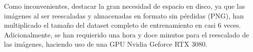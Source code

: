 Como inconvenientes, destacar la gran necesidad de espacio en disco, ya que las imágenes al ser reescaladas y almacenadas en formato sin pérdidas (PNG), han multiplicado el tamaño del dataset completo de entrenamiento en casi 6 veces. Adicionalmente, se han requierido una hora y doce minutos para el reescalado de las imágenes, haciendo uso de una GPU Nvidia Geforce RTX 3080. 



